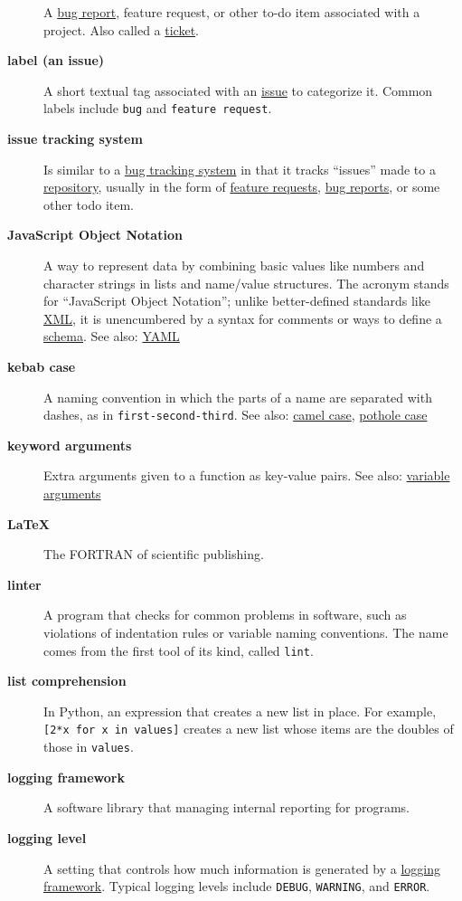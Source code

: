 \documentclass[
]{krantz}
\begin{document}
\begin{description}
A \protect\hyperlink{bug_report}{bug report}, feature request, or other to-do item associated with a project. Also called a \protect\hyperlink{ticket}{ticket}.
\item[\textbf{label (an issue)}]
A short textual tag associated with an \protect\hyperlink{issue}{issue} to categorize it. Common labels include \texttt{bug} and \texttt{feature\ request}.
\item[\textbf{issue tracking system}]
Is similar to a \protect\hyperlink{bug_tracker}{bug tracking system} in that it tracks ``issues'' made to a \protect\hyperlink{repository}{repository}, usually in the form of \protect\hyperlink{feature_request}{feature requests}, \protect\hyperlink{bug_report}{bug reports}, or some other todo item.
\item[\textbf{JavaScript Object Notation}]
A way to represent data by combining basic values like numbers and character strings in lists and name/value structures. The acronym stands for ``JavaScript Object Notation''; unlike better-defined standards like \protect\hyperlink{xml}{XML}, it is unencumbered by a syntax for comments or ways to define a \protect\hyperlink{schema}{schema}. See also: \protect\hyperlink{yaml}{YAML}
\item[\textbf{kebab case}]
A naming convention in which the parts of a name are separated with dashes, as in \texttt{first-second-third}. See also: \protect\hyperlink{camel_case}{camel case}, \protect\hyperlink{pothole_case}{pothole case}
\item[\textbf{keyword arguments}]
Extra arguments given to a function as key-value pairs. See also: \protect\hyperlink{variable_arguments}{variable arguments}
\item[\textbf{LaTeX}]
The FORTRAN of scientific publishing.
\item[\textbf{linter}]
A program that checks for common problems in software, such as violations of indentation rules or variable naming conventions. The name comes from the first tool of its kind, called \texttt{lint}.
\item[\textbf{list comprehension}]
In Python, an expression that creates a new list in place. For example, \texttt{{[}2*x\ for\ x\ in\ values{]}} creates a new list whose items are the doubles of those in \texttt{values}.
\item[\textbf{logging framework}]
A software library that managing internal reporting for programs.
\item[\textbf{logging level}]
A setting that controls how much information is generated by a \protect\hyperlink{logging_framework}{logging framework}. Typical logging levels include \texttt{DEBUG}, \texttt{WARNING}, and \texttt{ERROR}.

\end{description}
\end{document}
